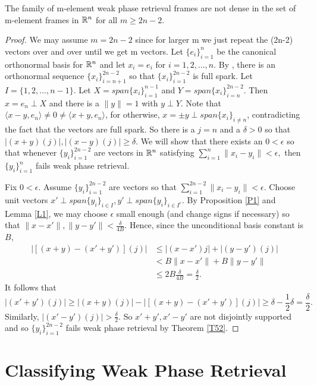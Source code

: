 \begin{theorem}
The family of m-element weak phase retrieval frames are not dense in the set of m-element frames in $\mathbb R^n$ for all $m\ge 2n-2$.
\end{theorem}

\begin{proof}
We may assume $m=2n-2$ since for larger m we just repeat the (2n-2) vectors over and over until we get m vectors.
Let $\{e_i\}_{i=1}^n$ be the canonical orthonormal basis for $\mathbb R^n$ and let
$x_i=e_i$ for $i=1,2,\ldots,n$. By \cite{CCPW13}, there is an orthonormal sequence $\{x_i\}_{i=n+1}^{2n-2}$
so that $\{x_i\}_{i=1}^{2n-2}$ is full spark. Let $I=\{1,2,\ldots,n-1\}$.
Let $X=span\{x_i\}_{i=1}^{n-1}$ and $Y=span\{x_i\}_{i=n}^{2n-2}$. Then $x=e_n\perp X$ and there is a 
$\|y\|=1$ with $y\perp Y$. Note that $\langle x-y,e_n\rangle \not= 0 \not= \langle x+y,e_n\rangle$, for
otherwise, $x=\pm y\perp span \{x_i\}_{i\not= n}$, contradicting the fact that the vectors are full spark.  So there is a $j=n$ and a $\delta>0$
so that $|(x+y)(j)|,|(x-y)(j)|\ge \delta.$
We will show that there exists an $0<\epsilon$ so that whenever $\{y_i\}_{i=1}^{2n-2}$ are
vectors in $\mathbb R^n$ satisfying
$ \sum_{i=1}^n\|x_i-y_i\|<\epsilon,$
then $\{y_i\}_{i=1}^n$ fails weak phase retrieval.


 Fix $0<\epsilon$. Assume $\{y_i\}_{i=1}^{2n-2}$ are vectors so that $\sum_{i=1}^{2n-2}\|x_i-y_i\|<\epsilon.$
Choose unit vectors $x'\perp span\{y_i\}_{i\in I},y'\perp span\{y_i\}_{i\in I^c}$. By Proposition \ref{P1} and Lemma \ref{L1},
we may choose $\epsilon$ small enough (and change signs if necessary) so that $\|x-x'\|,\|y-y'\|<\frac{\delta}{4B}$. Hence, since the
unconditional basis constant is $B$,
\begin{eqnarray*}
 |[(x+y)-(x'+y')](j)|&\le |(x-x')j|+|(y-y')(j)|\\&<B\|x-x'\|+B\|y-y'\|\\
&\le 2B\frac{\delta}{4B}=\frac{\delta}{2}.
 \end{eqnarray*}
It follows that
\[ |(x'+y')(j)|\ge |(x+y)(j)|-|[(x+y)-(x'+y')](j)|\ge \delta-\frac{1}{2}\delta=\frac{\delta}{2}.\]
Similarly, $|(x'-y')(j)|> \frac{\delta}{2}$. So $x'+y',x'-y'$ are not disjointly supported and so $\{y_i\}_{i=1}^{2n-2}$ fails weak phase retrieval
by Theorem \ref{T52}.
\end{proof}







\section{Classifying Weak Phase Retrieval}

